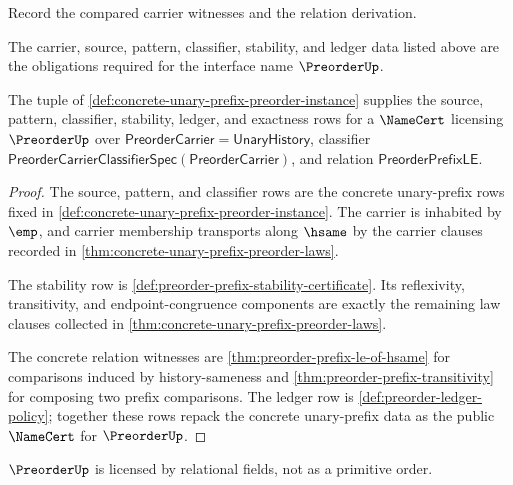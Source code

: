\begin{definition}
\label{def:preorder-ledger-policy}
Record the compared carrier witnesses and the relation derivation.
\end{definition}

\begin{definition}
\label{def:preorder-certificate-obligations}
The carrier, source, pattern, classifier, stability, and ledger data listed above are the obligations required for the interface name \(\PreorderUp\).
\end{definition}

\begin{theorem}
\label{thm:concrete-unary-prefix-preorder-namecert}
The tuple of \autoref{def:concrete-unary-prefix-preorder-instance} supplies
the source, pattern, classifier, stability, ledger, and exactness rows for a
$\NameCert$ licensing $\PreorderUp$ over
$\mathsf{PreorderCarrier}=\mathsf{UnaryHistory}$, classifier
$\mathsf{PreorderCarrierClassifierSpec}(\mathsf{PreorderCarrier})$, and
relation $\mathsf{PreorderPrefixLE}$.
\end{theorem}
\begin{proof}
The source, pattern, and classifier rows are the concrete unary-prefix rows
fixed in \autoref{def:concrete-unary-prefix-preorder-instance}. The carrier is
inhabited by $\emp$, and carrier membership transports along $\hsame$ by the
carrier clauses recorded in \autoref{thm:concrete-unary-prefix-preorder-laws}.

The stability row is \autoref{def:preorder-prefix-stability-certificate}. Its
reflexivity, transitivity, and endpoint-congruence components are exactly the
remaining law clauses collected in
\autoref{thm:concrete-unary-prefix-preorder-laws}.

The concrete relation witnesses are
\autoref{thm:preorder-prefix-le-of-hsame} for comparisons induced by
history-sameness and \autoref{thm:preorder-prefix-transitivity} for composing
two prefix comparisons. The ledger row is
\autoref{def:preorder-ledger-policy}; together these rows repack the concrete
unary-prefix data as the public $\NameCert$ for $\PreorderUp$.
\end{proof}

\begin{corollary}
\label{cor:preorder-licensed-not-primitive}
\(\PreorderUp\) is licensed by relational fields, not as a primitive order.
\end{corollary}

